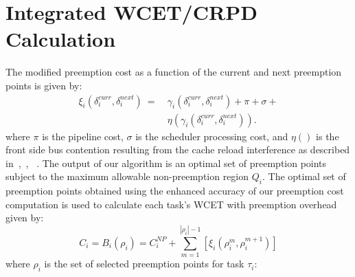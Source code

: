 \section{Integrated WCET/CRPD Calculation}\label{sec:schedulability_analysis}

The modified preemption cost as a function of the current and next preemption points is given by:
\begin{equation}\label{eqn:prempt-cost}
\begin{split}
    \xi_{i}(\delta_{i}^{curr},\delta_{i}^{next})\ =\ &\gamma_{i}(\delta_{i}^{curr},\delta_{i}^{next}) + \pi + \sigma + \\ &\eta(\gamma_{i}(\delta_{i}^{curr},\delta_{i}^{next})).
\end{split}
\end{equation}
%
 \noindent
 where \begin{math}\pi\end{math} is the pipeline cost, \begin{math}\sigma\end{math} is the scheduler processing cost, and \begin{math}\eta()\end{math} is the front side bus contention resulting from the cache reload interference as described in~\cite{pellizzoni:07},~\cite{pellizzoni:08}, ~\cite{pellizzoni:11}.
%
The output of our algorithm is an optimal set of preemption points subject to the maximum allowable non-preemption region \begin{math}Q_{i}\end{math}.  The optimal set of preemption points obtained using the enhanced accuracy of our preemption cost computation is used to calculate each task's WCET with preemption overhead given by:
\begin{equation}\label{eqn:wcet-cost}
   C_{i} = B_{i}(\rho_{i}) = C_{i}^{NP} + \sum_{m=1}^{|\rho_{i}|-1} [\xi_{i}(\rho_{i}^{m},\rho_{i}^{m+1})]
\end{equation}
\noindent
where \begin{math}\rho_{i}\end{math} is the set of selected preemption points for task \begin{math}\tau_{i}\end{math}:
